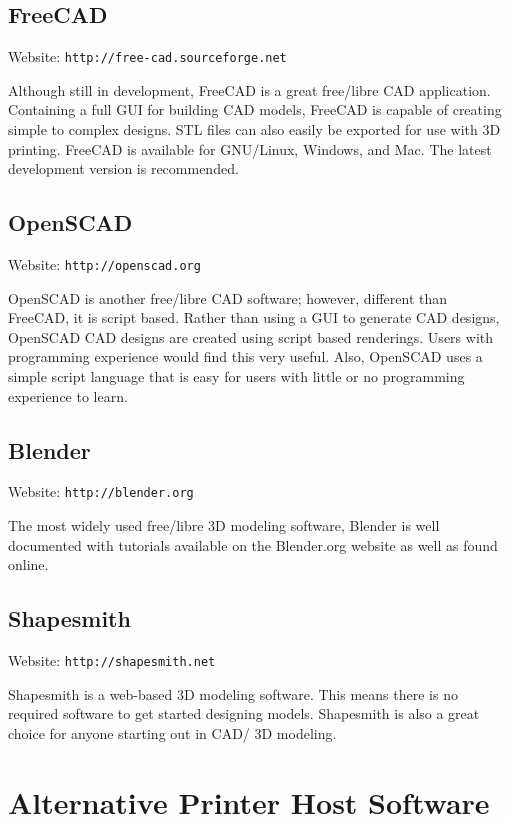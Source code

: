\subsection{FreeCAD}
Website: \texttt{http://free-cad.sourceforge.net}

Although still in development, FreeCAD is a great free/libre CAD application. Containing a full GUI for building CAD models, FreeCAD is capable of creating simple to complex designs. STL files can also easily be exported for use with 3D printing. FreeCAD is available for GNU/Linux, Windows, and Mac. The latest development version is recommended.

\subsection{OpenSCAD}
Website: \texttt{http://openscad.org}

OpenSCAD is another free/libre CAD software; however, different than FreeCAD, it is script based. Rather than using a GUI to generate CAD designs, OpenSCAD CAD designs are created using script based renderings. Users with programming experience would find this very useful. Also, OpenSCAD uses a simple script language that is easy for users with little or no programming experience to learn.

\subsection{Blender}
Website: \texttt{http://blender.org}

The most widely used free/libre 3D modeling software, Blender is well documented with tutorials available on the Blender.org website as well as found online.

\subsection{Shapesmith}
Website: \texttt{http://shapesmith.net}

Shapesmith is a web-based 3D modeling software. This means there is no required software to get started designing models. Shapesmith is also a great choice for anyone starting out in CAD/ 3D modeling.

\section{Alternative Printer Host Software}

